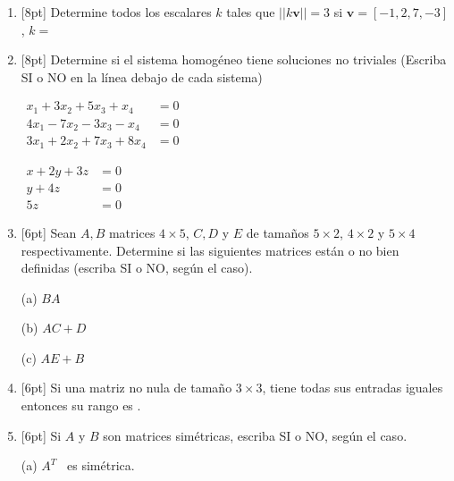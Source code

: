 \documentclass[11pt]{article}
\begin{document}
\begin{enumerate}
\item{}[8pt] Determine todos los escalares $k$ tales que $||k\mathbf{v}||=3$ si $\mathbf{v}=[-1,2,7,-3]$, $k=$ \dotfill

\item{}[8pt] Determine si el sistema homogéneo tiene soluciones no triviales (Escriba SI o NO en la línea debajo de cada sistema)

\vspace{6pt}
\noindent
\begin{minipage}[t]{0.5\linewidth}
$\begin{aligned}
x_1+3x_2+5x_3+x_4 &=0\\
4x_1-7x_2-3x_3-x_4 &=0\\
3x_1+2x_2+7x_3+8x_4 &=0
\end{aligned}$

\vspace{4pt}
\dotfill
\end{minipage}%
\begin{minipage}[t]{0.46\linewidth}
$\begin{aligned}
x+2y+3z &=0\\
y+4z &=0\\
5z &=0
\end{aligned}$

\vspace{4pt}
\dotfill
\end{minipage}

\item{}[6pt] Sean $A,B$ matrices $4\times 5$, $C,D$ y $E$ de tamaños $5\times 2$, $4\times 2$ y $5\times 4$ respectivamente. Determine si las siguientes matrices están o no bien definidas (escriba SI o NO, según el caso).

\vspace{6pt}
\noindent (a) $BA$ \dotfill

\vspace{4pt}
\noindent (b) $AC+D$ \dotfill

\vspace{4pt}
\noindent (c) $AE+B$ \dotfill

\item{}[6pt] Si una matriz no nula de tamaño $3\times 3$, tiene todas sus entradas iguales entonces su rango es \dotfill .

\item{}[6pt] Si $A$ y $B$ son matrices simétricas, escriba SI o NO, según el caso.

\vspace{6pt}
\noindent (a) $A^T$ \dotfill\ es simétrica.


\end{enumerate}
\end{document}
